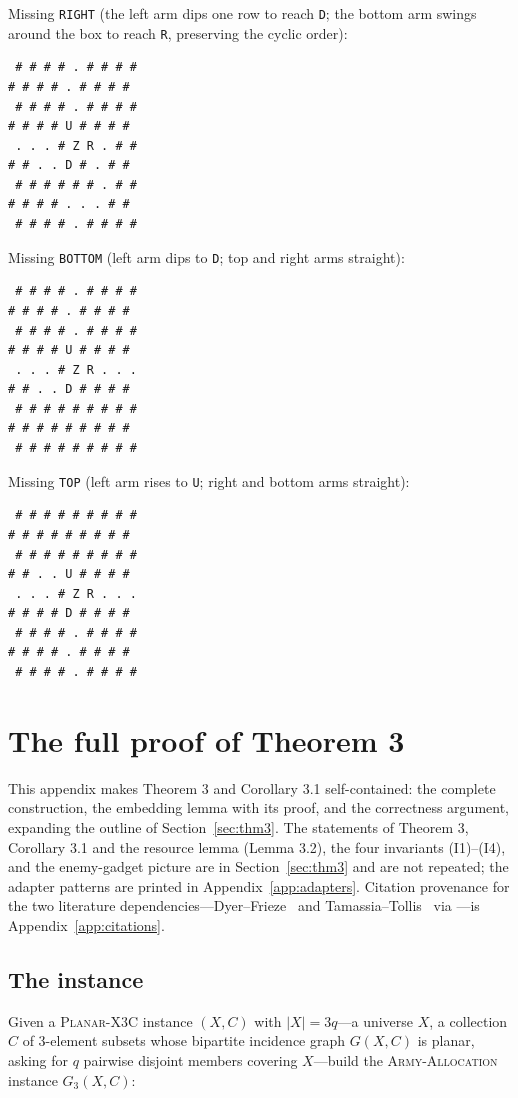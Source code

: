 \documentclass[11pt,a4paper]{article}
\theoremstyle{plain}
\theoremstyle{definition}
\theoremstyle{plain}
\theoremstyle{definition}
\theoremstyle{remark}
\newcommand{\ALLOC}{\textsc{Army-Allocation}}
\newcommand{\PX}{\textsc{Planar-X3C}}
\begin{document}
\noindent Missing \texttt{RIGHT} (the left arm dips one row to reach \texttt{D}; the bottom arm
swings around the box to reach \texttt{R}, preserving the cyclic order):

\begin{verbatim}
 # # # # . # # # #
# # # # . # # # #
 # # # # . # # # #
# # # # U # # # #
 . . . # Z R . # #
# # . . D # . # #
 # # # # # # . # #
# # # # . . . # #
 # # # # . # # # #
\end{verbatim}

\noindent Missing \texttt{BOTTOM} (left arm dips to \texttt{D}; top and right arms straight):

\begin{verbatim}
 # # # # . # # # #
# # # # . # # # #
 # # # # . # # # #
# # # # U # # # #
 . . . # Z R . . .
# # . . D # # # #
 # # # # # # # # #
# # # # # # # # #
 # # # # # # # # #
\end{verbatim}

\noindent Missing \texttt{TOP} (left arm rises to \texttt{U}; right and bottom arms straight):

\begin{verbatim}
 # # # # # # # # #
# # # # # # # # #
 # # # # # # # # #
# # . . U # # # #
 . . . # Z R . . .
# # # # D # # # #
 # # # # . # # # #
# # # # . # # # #
 # # # # . # # # #
\end{verbatim}

\section{The full proof of Theorem 3}\label{app:thm3}

This appendix makes Theorem 3 and Corollary 3.1 self-contained: the complete construction, the
embedding lemma with its proof, and the correctness argument, expanding the outline of
Section~\ref{sec:thm3}. The statements of Theorem 3, Corollary 3.1 and the resource lemma
(Lemma 3.2), the four invariants (I1)--(I4), and the enemy-gadget picture are in
Section~\ref{sec:thm3} and are not repeated; the adapter patterns are printed in
Appendix~\ref{app:adapters}. Citation provenance for the two literature
dependencies---Dyer--Frieze~\cite{DF86} and Tamassia--Tollis~\cite{TT89} via
\cite{DG13}---is Appendix~\ref{app:citations}.

\subsection{The instance}

Given a \PX{} instance $(X,C)$ with $|X|=3q$---a universe $X$, a collection $C$ of 3-element
subsets whose bipartite incidence graph $G(X,C)$ is planar, asking for $q$ pairwise disjoint
members covering $X$---build the \ALLOC{} instance $G_3(X,C)$:
\end{document}
